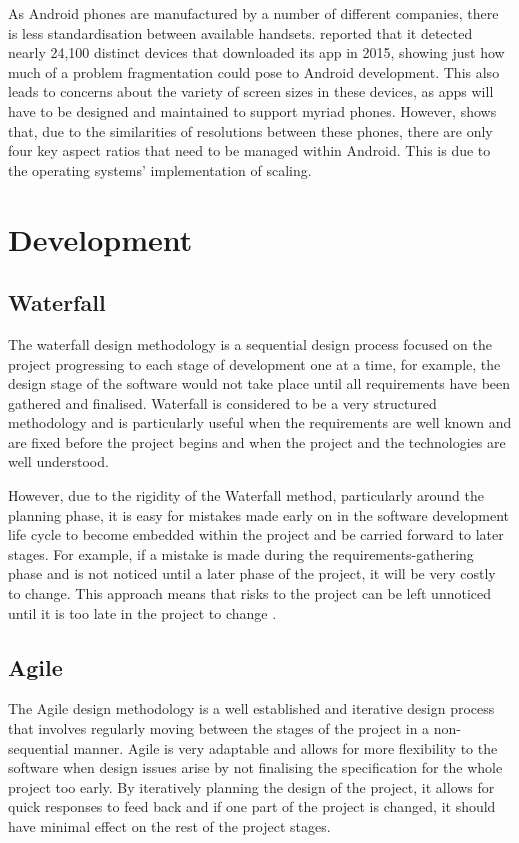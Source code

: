As Android phones are manufactured by a number of different companies, there is less standardisation between available handsets. 
\cite{uniqueandroiddevices} reported that it detected nearly 24,100 distinct devices that downloaded its app in 2015, showing just how much of a problem fragmentation could pose to Android development.
This also leads to concerns about the variety of screen sizes in these devices, as apps will have to be designed and maintained to support myriad phones. 
However, \cite{androidscreenfragmentation} shows that, due to the similarities of resolutions between these phones, there are only four key aspect ratios that need to be managed within Android. This is due to the operating systems' implementation of scaling.

\section{Development}
\subsection{Waterfall}
The waterfall design methodology is a sequential design process focused on the project progressing to each stage of development one at a time, for example, the design stage of the software would not take place until all requirements have been gathered and finalised.
Waterfall is considered to be a very structured methodology and is particularly useful when the requirements are well known and are fixed before the project begins and when the project and the technologies are well understood.

However, due to the rigidity of the Waterfall method, particularly around the planning phase, it is easy for mistakes made early on in the software development life cycle to become embedded within the project and be carried forward to later stages.
For example, if a mistake is made during the requirements-gathering phase and is not noticed until a later phase of the project, it will be very costly to change.
This approach means that risks to the project can be left unnoticed until it is too late in the project to change \cite{kruchten2001waterfall}.

\subsection{Agile}
The Agile design methodology is a well established and iterative design process that involves regularly moving between the stages of the project in a non-sequential manner. 
Agile is very adaptable and allows for more flexibility to the software when design issues arise by not finalising the specification for the whole project too early.
By iteratively planning the design of the project, it allows for quick responses to feed back and if one part of the project is changed, it should have minimal effect on the rest of the project stages. 

